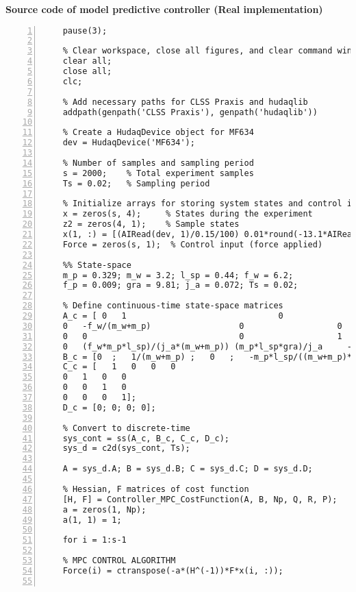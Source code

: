 \normalsize\bf{Source code of model predictive controller (Real implementation)}
\label{mpcReal.m}
\vspace{1cm}
\begin{lstlisting}[numbers=left,basicstyle=\scriptsize,caption={Source code of model predictive controller (Real implementation).},captionpos=b]	
	% Pause for 3 seconds to allow initialization
	pause(3);
	
	% Clear workspace, close all figures, and clear command window
	clear all;
	close all;
	clc;
	
	% Add necessary paths for CLSS Praxis and hudaqlib
	addpath(genpath('CLSS Praxis'), genpath('hudaqlib'))
	
	% Create a HudaqDevice object for MF634
	dev = HudaqDevice('MF634');
	
	% Number of samples and sampling period
	s = 2000;    % Total experiment samples
	Ts = 0.02;   % Sampling period
	
	% Initialize arrays for storing system states and control input
	x = zeros(s, 4);     % States during the experiment
	z2 = zeros(4, 1);    % Sample states
	x(1, :) = [(AIRead(dev, 1)/0.15/100) 0.01*round(-13.1*AIRead(dev, 3)) (-AIRead(dev, 2)/0.96*pi/180) 0]; % Initial values
	Force = zeros(s, 1);  % Control input (force applied)
	
	%% State-space
	m_p = 0.329; m_w = 3.2; l_sp = 0.44; f_w = 6.2; 
	f_p = 0.009; gra = 9.81; j_a = 0.072; Ts = 0.02; 
	
	% Define continuous-time state-space matrices
	A_c = [ 0   1                               0                   0
	0   -f_w/(m_w+m_p)                  0                   0
	0   0                               0                   1
	0   (f_w*m_p*l_sp)/(j_a*(m_w+m_p)) (m_p*l_sp*gra)/j_a     -f_p/j_a];   
	B_c = [0  ;   1/(m_w+m_p) ;   0   ;   -m_p*l_sp/((m_w+m_p)*j_a)];
	C_c = [   1   0   0   0
	0   1   0   0
	0   0   1   0
	0   0   0   1];
	D_c = [0; 0; 0; 0];
	
	% Convert to discrete-time
	sys_cont = ss(A_c, B_c, C_c, D_c);
	sys_d = c2d(sys_cont, Ts);
	
	A = sys_d.A; B = sys_d.B; C = sys_d.C; D = sys_d.D;
	
	% Hessian, F matrices of cost function
	[H, F] = Controller_MPC_CostFunction(A, B, Np, Q, R, P);
	a = zeros(1, Np);
	a(1, 1) = 1;
	
	for i = 1:s-1

	% MPC CONTROL ALGORITHM
	Force(i) = ctranspose(-a*(H^(-1))*F*x(i, :));
	

\end{lstlisting}
